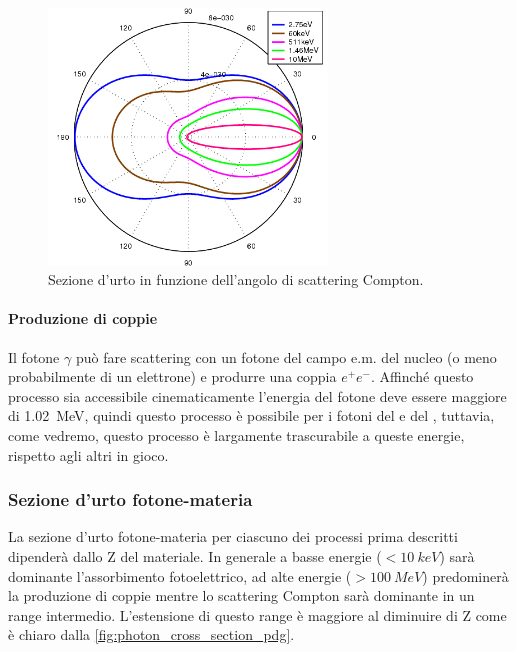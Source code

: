  \begin{figure}[h]
 	\centering
 	\includegraphics[width=20em]{klein-nishina}
 	\caption{\label{fig:klein-nishina}Sezione d'urto in funzione dell'angolo di scattering Compton.}
 \end{figure}

 \paragraph{Produzione di coppie}
 Il fotone $\gamma$ può fare scattering con un fotone del campo e.m. del nucleo (o meno probabilmente di un elettrone) e produrre una coppia $e^+e^-$. Affinché questo processo sia accessibile cinematicamente l'energia del fotone deve essere maggiore di \SI{1.02}{MeV}, quindi questo processo è possibile per i fotoni del \co\;  e del \na, tuttavia, come vedremo, questo processo è largamente trascurabile a queste energie, rispetto agli altri in gioco.
 
 
 \subsubsection{Sezione d'urto fotone-materia} \label{efficiency}
 La sezione d'urto fotone-materia per ciascuno dei processi prima descritti dipenderà dallo Z del materiale. In generale a basse energie ($ < \SI{10}{keV}$) sarà dominante l'assorbimento fotoelettrico, ad alte energie ($>\SI{100}{MeV}$) predominerà la produzione di coppie mentre lo scattering Compton sarà dominante in un range intermedio. L'estensione di questo range è maggiore al diminuire di Z come è chiaro dalla \autoref{fig:photon_cross_section_pdg}.
 

